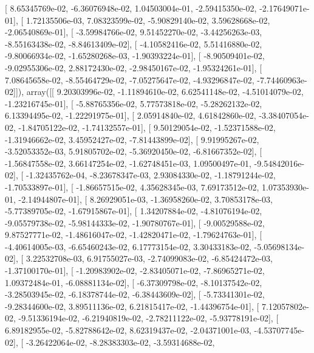 \documentclass{article}
\begin{document}
       [  8.65345769e-02,  -6.36076948e-02,   1.04503004e-01,
         -2.59415350e-02,  -2.17649071e-01],
       [  1.72135506e-03,   7.08323599e-02,  -5.90829140e-02,
          3.59628668e-02,  -2.06540869e-01],
       [ -3.59984766e-02,   9.51452270e-02,  -3.44256263e-03,
         -8.55163438e-02,  -8.84613409e-02],
       [ -4.10582416e-02,   5.51416880e-02,  -9.80066934e-02,
         -1.65280268e-03,  -1.90393224e-01],
       [ -8.90509401e-02,  -9.02955306e-02,   2.88172430e-02,
         -2.98450167e-02,  -1.95324261e-01],
       [  7.08645658e-02,  -8.55464729e-02,  -7.05275647e-02,
         -4.93296847e-02,  -7.74460963e-02]]), array([[  9.20303996e-02,  -1.11894610e-02,   6.62541148e-02,
         -4.51014079e-02,  -1.23216745e-01],
       [ -5.88765356e-02,   5.77573818e-02,  -5.28262132e-02,
          6.13394495e-02,  -1.22291975e-01],
       [  2.05914840e-02,   4.61842860e-02,  -3.38407054e-02,
         -1.84705122e-02,  -1.74132557e-01],
       [  9.50129054e-02,  -1.52371588e-02,  -1.31946662e-02,
          3.45952427e-02,  -7.81443899e-02],
       [  9.91995267e-02,  -3.52053352e-03,   5.91805702e-02,
         -5.36920450e-02,  -6.81667352e-02],
       [ -1.56847558e-02,   3.66147254e-02,  -1.62748451e-03,
          1.09500497e-01,  -9.54842016e-02],
       [ -1.32435762e-04,  -8.23678347e-03,   2.93084330e-02,
         -1.18791244e-02,  -1.70533897e-01],
       [ -1.86657515e-02,   4.35628345e-03,   7.69173512e-02,
          1.07353930e-01,  -2.14944807e-01],
       [  8.26929051e-03,  -1.36958260e-02,   3.70853178e-03,
         -5.77389705e-02,  -1.67915867e-01],
       [  1.34207884e-02,  -4.81076194e-02,  -9.05579738e-02,
         -5.98144333e-02,  -1.90780767e-01],
       [ -9.00529588e-02,   9.87527771e-02,  -1.48616047e-02,
         -1.42820471e-02,  -1.79624763e-01],
       [ -4.40614005e-03,  -6.65460243e-02,   6.17773154e-02,
          3.30433183e-02,  -5.05698134e-02],
       [  3.22532708e-03,   6.91755027e-03,  -2.74099083e-02,
         -6.85424472e-03,  -1.37100170e-01],
       [ -1.20983902e-02,  -2.83405071e-02,  -7.86965271e-02,
          1.09372484e-01,  -6.08881134e-02],
       [ -6.37309798e-02,  -8.10137542e-02,  -3.28503945e-02,
         -6.18378744e-02,  -6.38443609e-02],
       [ -5.73341301e-02,  -9.28344600e-02,   3.89511136e-02,
          6.21815417e-02,  -1.44396754e-01],
       [  7.12057802e-02,  -9.51336194e-02,  -6.21940819e-02,
         -2.78211122e-02,  -5.93778191e-02],
       [  6.89182955e-02,  -5.82788642e-02,   8.62319437e-02,
         -2.04371001e-03,  -4.53707745e-02],
       [ -3.26422064e-02,  -8.28383303e-02,  -3.59314688e-02,
\end{document}
